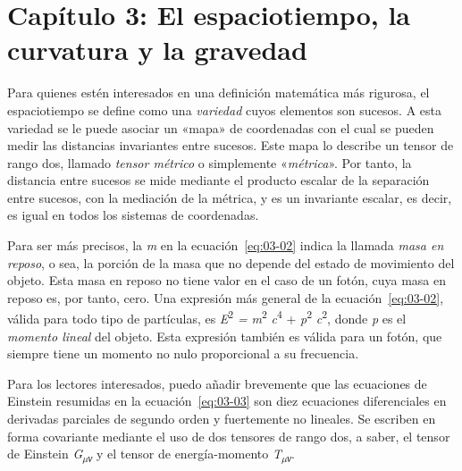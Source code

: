 \section*{Capítulo 3: El espaciotiempo, la curvatura y la gravedad}
\begin{description}[style=multiline,leftmargin=2em,labelwidth=1.5em]

\item[1.]\hypertarget{note:03-01}{}Para quienes estén interesados en una definición matemática
más rigurosa, el espaciotiempo se define como una \emph{variedad} cuyos elementos son sucesos.
A esta variedad se le puede asociar un «mapa» de coordenadas con el cual
se pueden medir las distancias invariantes entre sucesos. Este mapa lo describe un tensor
de rango dos, llamado \emph{tensor métrico} o simplemente
«\emph{métrica}». Por tanto, la distancia entre
sucesos se mide mediante el producto escalar de la separación entre sucesos, con la mediación
de la métrica, y es un invariante escalar, es decir, es igual en todos los sistemas de coordenadas.

\item[2.]\hypertarget{note:03-02}{}Para ser más precisos, la \emph{m} en la ecuación~\eqref{eq:03-02}
indica la llamada \emph{masa en reposo}, o sea, la porción de la masa que
no depende del estado de movimiento del objeto. Esta masa en reposo no tiene valor en el caso
de un fotón, cuya masa en reposo es, por tanto, cero. Una expresión más general de la
ecuación~\eqref{eq:03-02}, válida para todo tipo de partículas, es
\emph{E}\textsuperscript{2} \emph{= m}\textsuperscript{2}
\emph{c}\textsuperscript{4} + \emph{p}\textsuperscript{2} \emph{c}\textsuperscript{2},
donde \emph{p} es el \emph{momento lineal} del objeto. Esta expresión también es válida para
un fotón, que siempre tiene un momento no nulo proporcional a su frecuencia.

\item[3.]\hypertarget{note:03-03}{}Para los lectores interesados, puedo añadir brevemente que
las ecuaciones de Einstein resumidas en la ecuación~\eqref{eq:03-03} son diez ecuaciones
diferenciales en derivadas parciales de segundo orden y fuertemente
no lineales. Se escriben en forma covariante mediante
el uso de dos tensores de rango dos, a saber, el tensor de Einstein
\emph{G\textsubscript{µν}} y el tensor de energía-momento \emph{T\textsubscript{µν}}.


\end{description}
